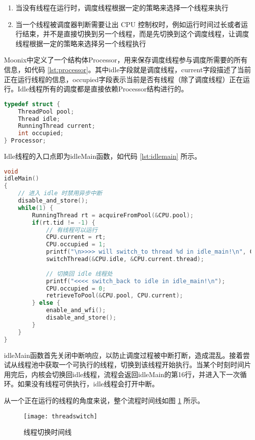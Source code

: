 \begin{enumerate}
	\item 当没有线程在运行时，调度线程根据一定的策略来选择一个线程来执行
	\item 当一个线程被调度器判断需要让出 CPU 控制权时，例如运行时间过长或者运行结束，并不是直接切换到另一个线程，而是先切换到这个调度线程，让调度线程根据一定的策略来选择另一个线程执行
\end{enumerate}

Moonix中定义了一个结构体Processor，用来保存调度线程参与调度所需要的所有信息，如代码 \ref{lst:processor}。其中idle字段就是调度线程，current字段描述了当前正在运行线程的信息，occupied字段表示当前是否有线程（除了调度线程）正在运行。Idle线程所有的调度都是直接依赖Processor结构进行的。

\begin{lstlisting}[language={C}, caption={Processor结构体}, label={lst:processor}]
typedef struct {
	ThreadPool pool;
	Thread idle;
	RunningThread current;
	int occupied;
} Processor;
\end{lstlisting}

Idle线程的入口点即为idleMain函数，如代码 \ref{lst:idlemain} 所示。

\begin{lstlisting}[language={C}, caption={idleMain函数}, label={lst:idlemain}]
void
idleMain()
{
	// 进入 idle 时禁用异步中断
	disable_and_store();
	while(1) {
		RunningThread rt = acquireFromPool(&CPU.pool);
		if(rt.tid != -1) {
			// 有线程可以运行
			CPU.current = rt;
			CPU.occupied = 1;
			printf("\n>>>> will switch_to thread %d in idle_main!\n", CPU.current.tid);
			switchThread(&CPU.idle, &CPU.current.thread);
			
			// 切换回 idle 线程处
			printf("<<<< switch_back to idle in idle_main!\n");
			CPU.occupied = 0;
			retrieveToPool(&CPU.pool, CPU.current);
		} else {
			enable_and_wfi();
			disable_and_store();
		}
	}
}
\end{lstlisting}

idleMain函数首先关闭中断响应，以防止调度过程被中断打断，造成混乱。接着尝试从线程池中获取一个可执行的线程，切换到该线程开始执行。当某个时刻时间片用完后，内核会切换回idle线程，流程会返回idleMain的第16行，并进入下一次循环。如果没有线程可供执行，idle线程会打开中断。

从一个正在运行的线程的角度来说，整个流程时间线如图 \ref{pic:threadswitch} 所示。

\begin{figure}[htpb]
	\centering
	\texttt{[image: threadswitch]}
	\setlength{\abovecaptionskip}{2pt}
	\caption{线程切换时间线}
	\label{pic:threadswitch}
\end{figure}

